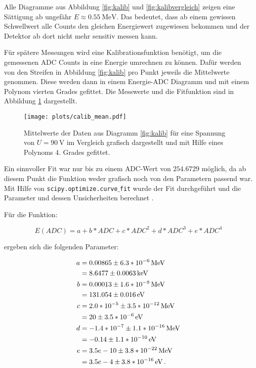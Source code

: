 Alle Diagramme aus Abbildung \ref{fig:kalib} und \ref{fig:kalibvergleich} 
zeigen eine Sättigung ab ungefähr $E \approx \SI{0.55}{\mega\electronvolt}$. 
Das bedeutet, dass ab einem gewissen Schwellwert alle Counts den gleichen 
Energiewert zugewiesen bekommen und der Detektor ab dort nicht mehr sensitiv 
messen kann. \par \medskip 

Für spätere Messungen wird eine Kalibrationsfunktion benötigt, um die gemessenen 
ADC Counts in eine Energie umrechnen zu können. Dafür werden von den Streifen 
in Abbildung \ref{fig:kalib} pro Punkt jeweils die Mittelwerte genommen. Diese 
werden dann in einem Energie-ADC Diagramm und mit einem Polynom vierten Grades 
gefittet. Die Messwerte und die Fitfunktion sind in Abbildung 
\ref{fig:kalibfunktion} dargestellt.

\begin{figure}[H]
  \centering
  \texttt{[image: plots/calib\_mean.pdf]}
  \caption{Mittelwerte der Daten aus Diagramm \ref{fig:kalib} für eine 
  Spannung von $U = \SI{90}{\volt}$ im Vergleich grafisch dargestellt 
  und mit Hilfe eines Polynoms 4. Grades gefittet.}
  \label{fig:kalibfunktion}
\end{figure}

Ein sinnvoller Fit war nur bis zu einem ADC-Wert von $254.6729$ möglich, da 
ab diesem Punkt die Funktion weder grafisch noch von den Parametern passend war. 
Mit Hilfe von \texttt{scipy.optimize.curve$\_$fit} wurde der Fit durchgeführt und die 
Parameter und dessen Unsicherheiten berechnet .\par 
Für die Funktion: 

\begin{equation}
E \left(ADC  \right) = a + b * ADC + c * ADC^2 + d * ADC^3 + e * ADC^4
\end{equation}

ergeben sich die folgenden Parameter: 

\begin{align*}
    a &= \SI[parse-numbers=false]{0.00865  \pm   6.3*10^{-6}}{\mega\electronvolt} \\
      &= \SI[parse-numbers=false]{8.6477 \pm 0.0063}{\kilo\electronvolt} \\
    b &= \SI[parse-numbers=false]{0.00013  \pm   1.6*10^{-8}}{\mega\electronvolt} \\
      &= \SI[parse-numbers=false]{131.054 \pm 0.016}{\electronvolt} \\
    c &= \SI[parse-numbers=false]{2.0*10^{-5}  \pm   3.5*10^{-12}}{\mega\electronvolt} \\
      &= \SI[parse-numbers=false]{20 \pm 3.5*10^{-6}}{\electronvolt} \\
    d &= \SI[parse-numbers=false]{-1.4*10^{-7}  \pm   1.1*10^{-16}}{\mega\electronvolt} \\
      &= \SI[parse-numbers=false]{-0.14 \pm 1.1*10^{-10}}{\electronvolt} \\
    e &= \SI[parse-numbers=false]{3.5e-10  \pm   3.8*10^{-22}}{\mega\electronvolt} \\
      &= \SI[parse-numbers=false]{3.5e-4 \pm 3.8*10^{-16}}{\electronvolt} \, . \\
\end{align*}
